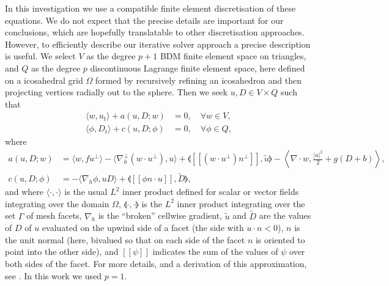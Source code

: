 \documentclass[a4paper]{article}
\newcommand{\jump}[1]{[\![#1]\!]}
\begin{document}
In this investigation we use a compatible finite element
discretisation of these equations. We do not expect that the precise
details are important for our conclusions, which are hopefully
translatable to other discretisation approaches. However, to
efficiently describe our iterative solver approach a precise
description is useful. We select $V$ as the degree $p+1$ BDM finite
element space on triangles, and $Q$ as the degree $p$ discontinuous
Lagrange finite element space, here defined on a icosahedral grid
$\Omega$ formed by recursively refining an icosahedron and then projecting
vertices radially out to the sphere. Then we seek $u,D\in V\times Q$
such that
\begin{align}
  \label{eq:ut}
  \langle w, u_t \rangle + a(u,D;w) 
   & = 0,
  \quad \forall w \in V, \\
  \label{eq:Dt}
  \langle \phi, D_t \rangle
+ c(u,D; \phi) & =
 0, \quad \forall \phi \in Q,
\end{align}
where
\begin{align}
   a(u,D;w) 
&=
  \langle w, fu^\perp \rangle 
  - \langle \nabla_h^\perp (w\cdot u^\perp), u \rangle
  + \llangle \jump{(w\cdot u^\perp) n^\perp}, \tilde{u} \rrangle  - \left\langle \nabla\cdot w, \frac{|u|^2}{2} + g(D+b) \right\rangle, \\
  c(u,D; \phi) &=
  - \langle \nabla_h \phi, uD \rangle
  + \llangle \jump{\phi n\cdot u}, \tilde{D} \rrangle,
\end{align}
and where $\langle \cdot , \cdot \rangle$ is the usual $L^2$ inner product
defined for scalar or vector fields integrating over the domain
$\Omega$, $\llangle\cdot,\cdot \rrangle$ is the $L^2$ inner product
integrating over the set $\Gamma$ of mesh facets, $\nabla_h$ is the
``broken'' cellwise gradient, $\tilde{u}$ and $\tilde{D}$ are the
values of $D$ of $u$ evaluated on the upwind side of a facet (the side
with $u\cdot n<0$), $n$ is the unit normal (here, bivalued so that on
each side of the facet $n$ is oriented to point into the other side),
and $\jump{\psi}$ indicates the sum of the values of $\psi$ over both
sides of the facet. For more details, and a derivation of this approximation,
see \cite{gibson2019compatible}. In this work we used $p=1$.
\end{document}
